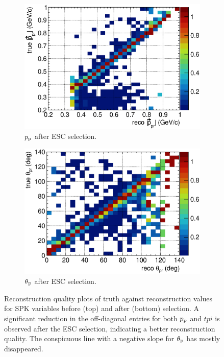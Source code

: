 \begin{figure}[ht]
        \begin{subfigure}{\dbfigwid\textwidth}
             \centering
             \includegraphics[width=\textwidth]{figures/sel/p_pr_colnor_resmat_al14.eps}
             \caption{$p_\textrm{p}$ after ESC selection.}
             \label{subfig:esc-ppr-afesc}
        \end{subfigure}
        \begin{subfigure}{\dbfigwid\textwidth}
             \centering
             \includegraphics[width=\textwidth]{figures/sel/theta_pr_colnor_resmat_al14.eps}
             \caption{$\theta_\textrm{p}$ after ESC selection.}
             \label{subfig:esc-tpr-afesc}
        \end{subfigure}
        \caption{Reconstruction quality plots of truth against reconstruction values for SPK variables before (top) and after (bottom) selection. A significant reduction in the off-diagonal entries for both $p_\textrm{p}$ and $tpi$ is observed after the ESC selection, indicating a better reconstruction quality. The conspicuous line with a negative slope for $\theta_\textrm{p}$ has mostly disappeared.}
        \label{fig:esc-spk}
  \end{figure}

